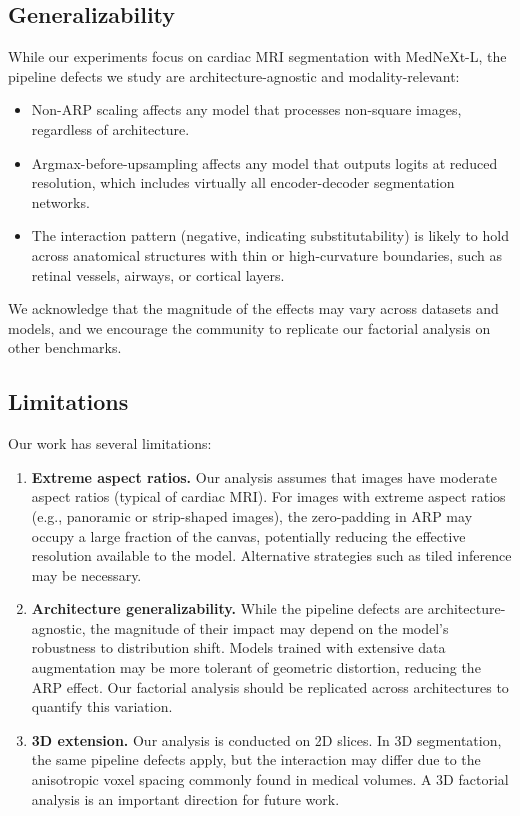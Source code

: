 \documentclass[10pt,twocolumn]{article}
\begin{document}
\subsection{Generalizability}

While our experiments focus on cardiac MRI segmentation with MedNeXt-L, the pipeline defects we study are architecture-agnostic and modality-relevant:
\begin{itemize}[leftmargin=*]
    \item Non-ARP scaling affects any model that processes non-square images, regardless of architecture.
    \item Argmax-before-upsampling affects any model that outputs logits at reduced resolution, which includes virtually all encoder-decoder segmentation networks.
    \item The interaction pattern (negative, indicating substitutability) is likely to hold across anatomical structures with thin or high-curvature boundaries, such as retinal vessels, airways, or cortical layers.
\end{itemize}
We acknowledge that the magnitude of the effects may vary across datasets and models, and we encourage the community to replicate our factorial analysis on other benchmarks.

\subsection{Limitations}

Our work has several limitations:
\begin{enumerate}[leftmargin=*]
    \item \textbf{Extreme aspect ratios.} Our analysis assumes that images have moderate aspect ratios (typical of cardiac MRI). For images with extreme aspect ratios (e.g., panoramic or strip-shaped images), the zero-padding in ARP may occupy a large fraction of the canvas, potentially reducing the effective resolution available to the model. Alternative strategies such as tiled inference may be necessary.
    \item \textbf{Architecture generalizability.} While the pipeline defects are architecture-agnostic, the magnitude of their impact may depend on the model's robustness to distribution shift. Models trained with extensive data augmentation may be more tolerant of geometric distortion, reducing the ARP effect. Our factorial analysis should be replicated across architectures to quantify this variation.
    \item \textbf{3D extension.} Our analysis is conducted on 2D slices. In 3D segmentation, the same pipeline defects apply, but the interaction may differ due to the anisotropic voxel spacing commonly found in medical volumes. A 3D factorial analysis is an important direction for future work.
\end{enumerate}
\end{document}
